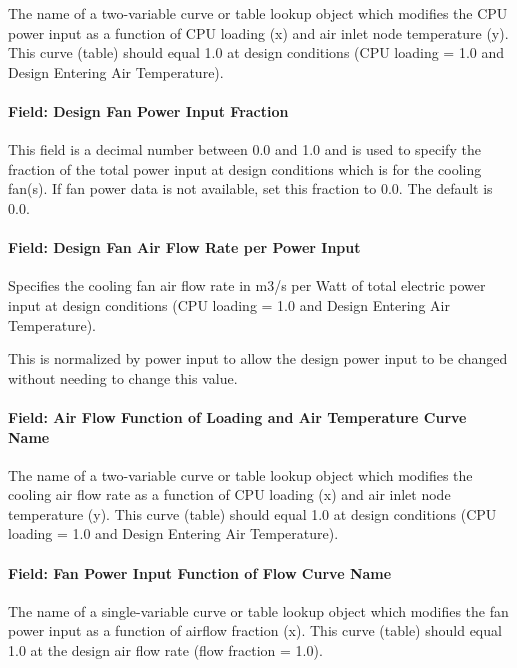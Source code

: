 The name of a two-variable curve or table lookup object which modifies the CPU power input as a function of CPU loading (x) and air inlet node temperature (y). This curve (table) should equal 1.0 at design conditions (CPU loading = 1.0 and Design Entering Air Temperature).

\paragraph{Field: Design Fan Power Input Fraction}\label{field-design-fan-power-input-fraction}

This field is a decimal number between 0.0 and 1.0 and is used to specify the fraction of the total power input at design conditions which is for the cooling fan(s). If fan power data is not available, set this fraction to 0.0. The default is 0.0.

\paragraph{Field: Design Fan Air Flow Rate per Power Input}\label{field-design-fan-air-flow-rate-per-power-input}

Specifies the cooling fan air flow rate in m3/s per Watt of total electric power input at design conditions (CPU loading = 1.0 and Design Entering Air Temperature).

This is normalized by power input to allow the design power input to be changed without needing to change this value.

\paragraph{Field: Air Flow Function of Loading and Air Temperature Curve Name}\label{field-air-flow-function-of-loading-and-air-temperature-curve-name}

The name of a two-variable curve or table lookup object which modifies the cooling air flow rate as a function of CPU loading (x) and air inlet node temperature (y). This curve (table) should equal 1.0 at design conditions (CPU loading = 1.0 and Design Entering Air Temperature).

\paragraph{Field: Fan Power Input Function of Flow Curve Name}\label{field-fan-power-input-function-of-flow-curve-name}

The name of a single-variable curve or table lookup object which modifies the fan power input as a function of airflow fraction (x). This curve (table) should equal 1.0 at the design air flow rate (flow fraction = 1.0).

